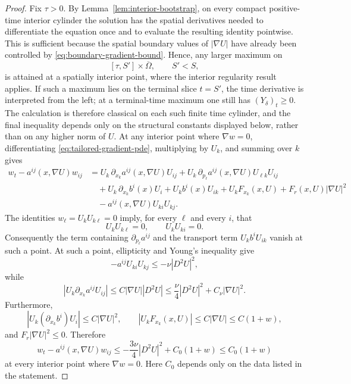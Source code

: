 \documentclass[10pt,a4paper]{amsart}
\newcommand{\nupar}{\nu}
\begin{document}
\begin{proof}
Fix $\tau>0$. By Lemma~\ref{lem:interior-bootstrap}, on every compact
positive-time interior cylinder the solution has the spatial derivatives
needed to differentiate the equation once and to evaluate the resulting
identity pointwise. This is sufficient because the spatial boundary values
of $|\nabla U|$ have already been controlled by
\eqref{eq:boundary-gradient-bound}. Hence, any larger maximum on
\[
[\tau,S']\times\overline{\Omega},
\qquad S'<S,
\]
is attained at a spatially interior point, where the interior regularity
result applies. If such a maximum lies on the terminal slice $t=S'$, the
time derivative is interpreted from the left; at a terminal-time maximum
one still has $(Y_\delta)_t\geq0$. The calculation is therefore classical
on each such finite time cylinder, and the final inequality depends only
on the structural constants displayed below, rather than on any higher
norm of $U$. At any interior point where $\nabla w=0$, differentiating \eqref{eq:tailored-gradient-pde}, multiplying by $U_k$, and summing over $k$ gives
\[
\begin{aligned}
        w_t-a^{ij}(x,\nabla U)w_{ij}
        &=U_k\,\partial_{x_k}a^{ij}(x,\nabla U)U_{ij}
        +U_k\,\partial_{p_\ell}a^{ij}(x,\nabla U)U_{\ell k}U_{ij} \\
        &\quad+U_k\,\partial_{x_k}b^i(x)U_i
        +U_k b^i(x)U_{ik}
        +U_kF_{x_k}(x,U)+F_r(x,U)|\nabla U|^2 \\
        &\quad-a^{ij}(x,\nabla U)U_{ki}U_{kj}.
\end{aligned}
\]
The identities $w_\ell=U_kU_{k\ell}=0$ imply, for every $\ell$ and every $i$, that
\[
        U_kU_{k\ell}=0,
        \qquad
        U_kU_{ki}=0.
\]
Consequently the term containing $\partial_{p_\ell}a^{ij}$ and the transport term $U_kb^iU_{ik}$ vanish at such a point.  At such a point, ellipticity and Young's inequality give
\[
 -a^{ij}U_{ki}U_{kj}\le-\nupar|D^2U|^2,
\]
while
\[
 |U_k\partial_{x_k}a^{ij}U_{ij}|
 \le C|\nabla U||D^2U|
 \le \frac{\nupar}{4}|D^2U|^2+C_\nu|\nabla U|^2.
\]
Furthermore,
\[
 |U_k(\partial_{x_k}b^i)U_i|\le C|\nabla U|^2,
 \qquad
 |U_kF_{x_k}(x,U)|\le C|\nabla U|\le C(1+w),
\]
and $F_r|\nabla U|^2\le0$.  Therefore
\[
        w_t-a^{ij}(x,\nabla U)w_{ij}
        \le
        -\frac{3\nupar}{4}|D^2U|^2+C_0(1+w)
        \le C_0(1+w)
\]
at every interior point where $\nabla w=0$.  Here $C_0$ depends only on the data listed in the statement.


\end{proof}
\end{document}

